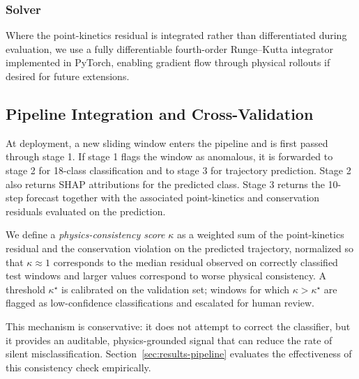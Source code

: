 \subsubsection{Solver}

Where the point-kinetics residual is integrated rather than differentiated during evaluation, we use a fully differentiable fourth-order Runge--Kutta integrator implemented in PyTorch, enabling gradient flow through physical rollouts if desired for future extensions.

\subsection{Pipeline Integration and Cross-Validation}
\label{sec:integration}

At deployment, a new sliding window enters the pipeline and is first passed through stage 1. If stage 1 flags the window as anomalous, it is forwarded to stage 2 for 18-class classification and to stage 3 for trajectory prediction. Stage 2 also returns SHAP attributions for the predicted class. Stage 3 returns the 10-step forecast together with the associated point-kinetics and conservation residuals evaluated on the prediction.

We define a \emph{physics-consistency score} $\kappa$ as a weighted sum of the point-kinetics residual and the conservation violation on the predicted trajectory, normalized so that $\kappa \approx 1$ corresponds to the median residual observed on correctly classified test windows and larger values correspond to worse physical consistency. A threshold $\kappa^\star$ is calibrated on the validation set; windows for which $\kappa > \kappa^\star$ are flagged as low-confidence classifications and escalated for human review.

This mechanism is conservative: it does not attempt to correct the classifier, but it provides an auditable, physics-grounded signal that can reduce the rate of silent misclassification. Section~\ref{sec:results-pipeline} evaluates the effectiveness of this consistency check empirically.
